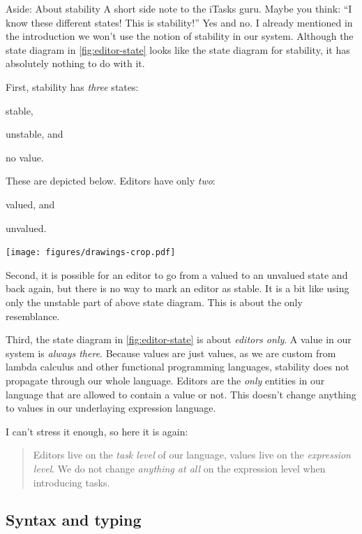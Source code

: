 \begin{margintext}{Aside: About stability}
A short side note to the iTasks guru.
Maybe you think: \enquote{I know these different states! This is stability!}
Yes and no.
I already mentioned in the introduction we won't use the notion of stability in our system.
Although the state diagram in \autoref{fig:editor-state} looks like the state diagram for stability,
it has absolutely nothing to do with it.

First, stability has \emph{three} states:
\begin{enumerate*}
  \item stable,
  \item unstable, and
  \item no value.
\end{enumerate*}
These are depicted below.
Editors have only \emph{two}:
\begin{enumerate*}
  \item valued, and
  \item unvalued.
\end{enumerate*}

\texttt{[image: figures/drawings-crop.pdf]}

Second,
it is possible for an editor to go from a valued to an unvalued state and back again,
but there is no way to mark an editor as stable.
It is a bit like using only the unstable part of above state diagram.
This is about the only resemblance.

Third,
the state diagram in \autoref{fig:editor-state} is about \emph{editors only}.
A value in our system is \emph{always there}.
Because values are just values,
as we are custom from lambda calculus and other functional programming languages,
stability does not propagate through our whole language.
Editors are the \emph{only} entities in our language that are allowed to contain a value or not.
This doesn't change anything to values in our underlaying expression language.

I can't stress it enough, so here it is again:
\begin{quote}
Editors live on the \emph{task level} of our language,
values live on the \emph{expression level}.
We do not change \emph{anything at all} on the expression level when introducing tasks.
\end{quote}
\end{margintext}


\subsection{Syntax and typing}

